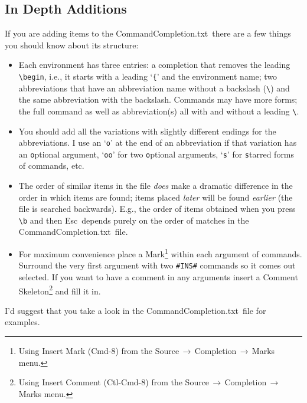 \documentclass[11pt]{article}
\newcommand{\ctlkey}{\textsf{Ctl}}
\newcommand{\cmdkey}{\textsf{Cmd}}
\newcommand{\esckey}{\textsf{Esc}}
\newcommand{\shiftkey}{\textsf{Shift}}
\newcommand{\mnu}[1]{\textsf{#1}}
\newcommand{\To}{\,\(\to\)\,}
\newcommand{\CCT}{\textsf{CommandCompletion.txt}}
\begin{document}
\subsection*{In Depth Additions}

If you are adding items to the \CCT\ there are a few things you should know about its structure:
\begin{itemize}
\item
Each environment has three entries: a completion that removes the leading \verb|\begin|, i.e., it starts with a leading `\texttt{\{}' and the environment name; two abbreviations that have an abbreviation name without a backslash (\verb|\|) and the same abbreviation with the backslash. Commands may have more forms; the full command as well as abbreviation(s) all with and without a leading \verb|\|.
\item
You should add all the variations with slightly different endings for the abbreviations. I use an `\texttt{o}' at the end of an abbreviation if that variation has an \texttt{o}ptional argument, `\texttt{oo}' for two \texttt{o}ptional arguments, `\texttt{s}' for \texttt{s}tarred forms of commands, etc.
\item
The order of similar items in the file \emph{does} make a dramatic difference in the order in which items are found; items placed \emph{later} will be found \emph{earlier} (the file is searched backwards). E.g., the order of items obtained when you press \verb|\b| and then \esckey\ depends purely on the order of matches in the \CCT\ file.
\item
For maximum convenience place a Mark\footnote{Using \mnu{Insert Mark} (\cmdkey-\textsf{8}) from the \mnu{Source}\To\mnu{Completion}\To\mnu{Marks} menu.} within each argument of commands. Surround the very first argument with two \verb|#INS#| commands so it comes out selected. If you want to have a comment in any arguments insert a Comment Skeleton\footnote{Using \mnu{Insert Comment} (\ctlkey-\cmdkey-\textsf{8}) from the \mnu{Source}\To\mnu{Completion}\To\mnu{Marks} menu.} and fill it in.
\end{itemize}
I'd suggest that you take a look in the \CCT\ file for examples.

%
\end{document}
